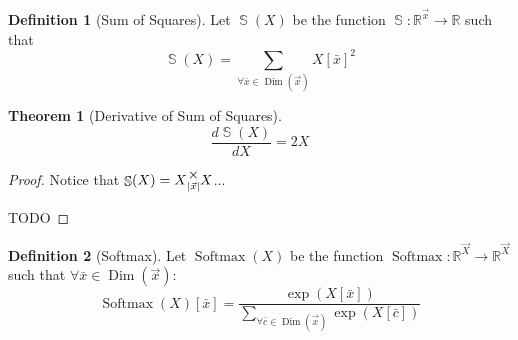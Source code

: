 \documentclass[12pt]{article}
\theoremstyle{definition}
\newtheorem{definition}{Definition}[section]
\theoremstyle{plain}
\newtheorem{theorem}{Theorem}[section]
\theoremstyle{ppart}
\DeclareMathOperator{\Dim}{Dim}
\DeclareMathOperator{\SoS}{\mathbb{S}}
\DeclareMathOperator{\Softmax}{Softmax}
\newcommand{\mmult}[1]{\text{\raisebox{1ex}{$\underset{#1}{\times}$}}}
\begin{document}
\begin{definition}[Sum of Squares]
Let $\SoS(X)$ be the function $\SoS : \mathbb{R}^{\vec{x}} \to \mathbb{R}$
such that 
\[ \SoS(X) = \sum_{\forall \bar{x} \in \Dim(\vec{x})} X[\bar{x}]^2 \]
\end{definition}

\begin{theorem}[Derivative of Sum of Squares]
\[ \frac{d \SoS(X)}{dX} = 2X \]
\end{theorem}
\begin{proof}
Notice that $\SoS(X) = X \mmult{|\vec{x}|} X$...

TODO
\end{proof}

\begin{definition}[Softmax]
Let $\Softmax(X)$ be the function
$\Softmax : \mathbb{R}^{\vec{X}} \to \mathbb{R}^{\vec{X}}$
such that $\forall \bar{x} \in \Dim(\vec{x}):$
\[
  \Softmax(X)[\bar{x}] = \frac{
		\exp(X[\bar{x}])
	}{
		\sum_{\forall \bar{c} \in \Dim(\vec{x})} \exp(X[\bar{c}])
	}
\]
\end{definition}
\end{document}

